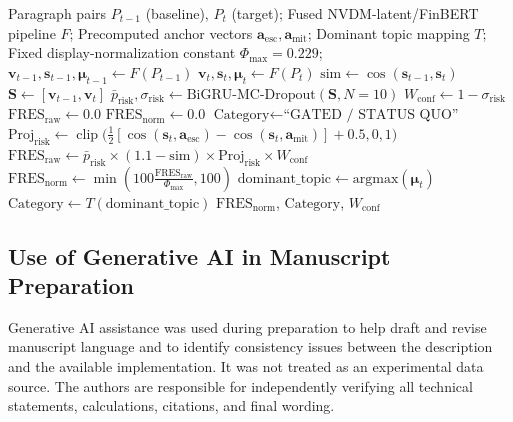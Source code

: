 \documentclass[pdflatex,sn-basic,Numbered]{sn-jnl}
\begin{document}
\begin{algorithm}[h]
\caption{FRES Scoring and Topic-Taxonomy Routing}
\begin{algorithmic}[1]
\REQUIRE Paragraph pairs $P_{t-1}$ (baseline), $P_t$ (target);
\REQUIRE Fused NVDM-latent/FinBERT pipeline $F$;
\REQUIRE Precomputed anchor vectors $\mathbf{a}_{\text{esc}}, \mathbf{a}_{\text{mit}}$;
\REQUIRE Dominant topic mapping $T$;
\REQUIRE Fixed display-normalization constant $\Phi_{\text{max}}=0.229$;
\STATE $\mathbf{v}_{t-1}, \mathbf{s}_{t-1}, \boldsymbol{\mu}_{t-1} \leftarrow F(P_{t-1})$
\STATE $\mathbf{v}_t, \mathbf{s}_t, \boldsymbol{\mu}_t \leftarrow F(P_t)$
\STATE $\text{sim} \leftarrow \cos(\mathbf{s}_{t-1}, \mathbf{s}_t)$
\STATE $\mathbf{S} \leftarrow [\mathbf{v}_{t-1}, \mathbf{v}_t]$
\STATE $\bar{p}_{\text{risk}}, \sigma_{\text{risk}} \leftarrow \text{BiGRU-MC-Dropout}(\mathbf{S}, N=10)$
\STATE $W_{\text{conf}} \leftarrow 1 - \sigma_{\text{risk}}$
    \STATE $\text{FRES}_{\text{raw}} \leftarrow 0.0$
    \STATE $\text{FRES}_{\text{norm}} \leftarrow 0.0$
    \STATE $\text{Category} \leftarrow \text{``GATED / STATUS QUO''}$
\ELSE
    \STATE $\text{Proj}_{\text{risk}} \leftarrow \operatorname{clip}\big(\frac{1}{2}[\cos(\mathbf{s}_t, \mathbf{a}_{\text{esc}}) - \cos(\mathbf{s}_t, \mathbf{a}_{\text{mit}})] + 0.5, 0, 1\big)$
    \STATE $\text{FRES}_{\text{raw}} \leftarrow \bar{p}_{\text{risk}} \times (1.1 - \text{sim}) \times \text{Proj}_{\text{risk}} \times W_{\text{conf}}$
    \STATE $\text{FRES}_{\text{norm}} \leftarrow \min\left(100 \frac{\text{FRES}_{\text{raw}}}{\Phi_{\text{max}}}, 100\right)$
    \STATE $\text{dominant\_topic} \leftarrow \text{argmax}(\boldsymbol{\mu}_t)$
    \STATE $\text{Category} \leftarrow T(\text{dominant\_topic})$
\ENDIF
\RETURN $\text{FRES}_{\text{norm}}$, $\text{Category}$, $W_{\text{conf}}$
\end{algorithmic}
\end{algorithm}

\subsection{Use of Generative AI in Manuscript Preparation}
Generative AI assistance was used during preparation to help draft and revise manuscript language and to identify consistency issues between the description and the available implementation. It was not treated as an experimental data source. The authors are responsible for independently verifying all technical statements, calculations, citations, and final wording.
\end{document}
